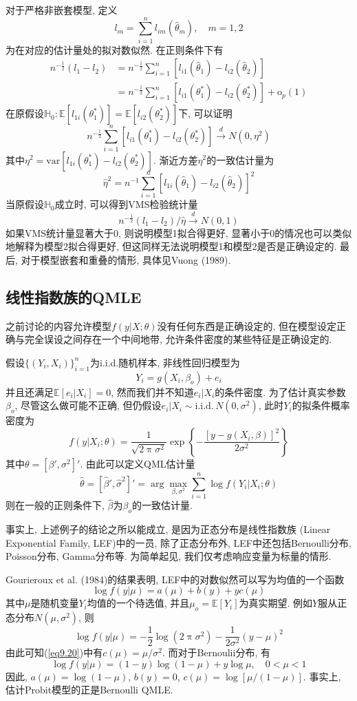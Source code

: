 \documentclass[cn, 12pt, math=mtpro2, bibstyle=apa, blue, twocol]{elegantbook}
\newcommand{\E}{\mathbb{E}}
\newcommand{\HH}{\mathbb{H}}
\newcommand{\hth}{\hat{\theta}}
\begin{document}
对于严格非嵌套模型, 定义
$$l_{m}=\sum_{i=1}^{n}l_{im}(\hat{\theta}_m),\quad m=1,2$$
为在对应的估计量处的拟对数似然. 在正则条件下有
\begin{align*}
n^{-\frac{1}{2}}(l_1-l_2)&=n^{-\frac{1}{2}}\sum_{i=1}^{n}[l_{i1}(\hth_1)-l_{i2}(\hth_2)] \\
&=n^{-\frac{1}{2}}\sum_{i=1}^{n}[l_{i1}(\theta_1^\ast)-l_{i2}(\theta_2^\ast)]+\text{o}_p(1)
\end{align*}
在原假设$\HH_0: \E[l_{1i}(\theta_1^\ast)]=\E[l_{i2}(\theta_2^\ast)]$下, 可以证明
$$n^{-\frac{1}{2}}\sum_{i=1}^{n}[l_{i1}(\theta_1^\ast)-l_{i2}(\theta_2^\ast)]\xrightarrow{d} N(0,\eta^2)$$
其中$\eta^2=\text{var}[l_{1i}(\theta_1^\ast)-l_{i2}(\theta_2^\ast)]$. 渐近方差$\eta^2$的一致估计量为
$$\hat{\eta}^2=n^{-1}\sum_{i=1}^{n}[l_{1i}(\hth_1)-l_{i2}(\hth_2)]^2$$
当原假设$\HH_0$成立时, 可以得到VMS检验统计量
$$n^{-\frac{1}{2}}(l_1-l_2)/\hat{\eta}\xrightarrow{d}N(0,1)$$
如果VMS统计量显著大于0, 则说明模型1拟合得更好, 显著小于0的情况也可以类似地解释为模型2拟合得更好, 但这同样无法说明模型1和模型2是否是正确设定的. 最后, 对于模型嵌套和重叠的情形, 具体见Vuong (1989).
\subsection{线性指数族的QMLE}
之前讨论的内容允许模型$f(y|X;\theta)$没有任何东西是正确设定的, 但在模型设定正确与完全误设之间存在一个中间地带, 允许条件密度的某些特征是正确设定的.

\begin{example}
假设$\{(Y_i,X_i)\}_{i=1}^n$为i.i.d.随机样本, 非线性回归模型为
$$Y_i=g(X_i,\beta_o)+e_i$$
并且还满足$\E[e_i|X_i]=0$, 然而我们并不知道$e_i|X_i$的条件密度. 为了估计真实参数$\beta_o$, 尽管这么做可能不正确, 但仍假设$e_i|X_i\sim \text{i.i.d.}\,N(0,\sigma^2)$, 此时$Y_i$的拟条件概率密度为
$$f(y|X_i;\theta)=\frac{1}{\sqrt{2\uppi\sigma^2}}\exp\left\{-\frac{[y-g(X_i,\beta)]^2}{2\sigma^2}\right\}$$
其中$\theta=[\beta',\sigma^2]'$. 由此可以定义QML估计量
$$\hat{\theta}=[\hat{\beta}',\hat{\sigma}^2]'=\arg\max_{\beta,\sigma^2}\sum_{i=1}^{n}\log f(Y_i|X_i;\theta)$$
则在一般的正则条件下, $\hat{\beta}$为$\beta_o$的一致估计量.
\end{example}

事实上, 上述例子的结论之所以能成立, 是因为正态分布是线性指数族 (Linear Exponential Family, LEF)中的一员, 除了正态分布外, LEF中还包括Bernoulli分布, Poisson分布, Gamma分布等. 为简单起见, 我们仅考虑响应变量为标量的情形.

Gourieroux et al. (1984)的结果表明, LEF中的对数似然可以写为均值的一个函数
\begin{equation}\label{eq9.20}
  \log f(y|\mu)=a(\mu)+b(y)+yc(\mu)
\end{equation}
其中$\mu$是随机变量$Y_i$均值的一个待选值, 并且$\mu_o=\E[Y_i]$为真实期望. 例如$Y$服从正态分布$N(\mu,\sigma^2)$, 则
$$\log f(y|\mu)=-\frac{1}{2}\log(2\uppi\sigma^2)-\frac{1}{2\sigma^2}(y-\mu)^2$$
由此可知(\ref{eq9.20})中有$c(\mu)=\mu/\sigma^2$. 而对于Bernoulii分布, 有
$$\log f(y|\mu)=(1-y)\log(1-\mu)+y\log\mu,\quad 0<\mu<1$$
因此, $a(\mu)=\log(1-\mu)$, $b(y)=0$, $c(\mu)=\log[\mu/(1-\mu)]$. 事实上, 估计Probit模型的正是Bernoulli QMLE.
\end{document}
